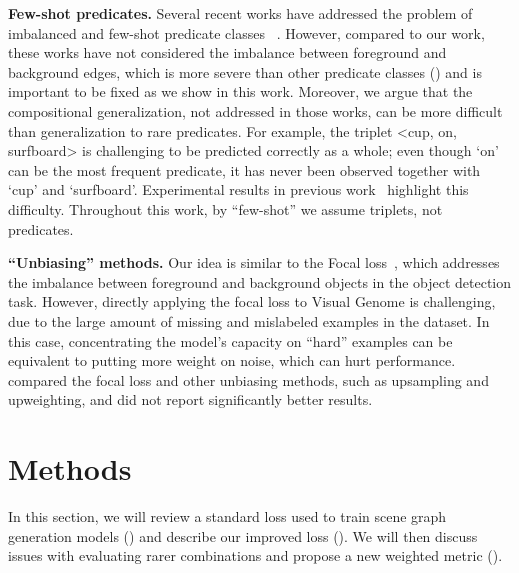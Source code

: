 \textbf{Few-shot predicates.} 
Several recent works have addressed the problem of imbalanced and few-shot predicate classes ~\citep{chen2019knowledge, dornadula2019visual,tang2019learning,zhang2019graphical,tang2020unbiased,chen2019scene}. However, compared to our work, these works have not considered the imbalance between foreground and background edges, which is more severe than other predicate classes (\fig{\ref{fig:pred_distr}}) and is important to be fixed as we show in this work.
Moreover, we argue that the compositional generalization, not addressed in those works, can be more difficult than generalization to rare predicates. For example, the triplet <cup, on, surfboard> is challenging to be predicted correctly as a whole; even though `on' can be the most frequent predicate, it has never been observed together with `cup' and `surfboard'. Experimental results in previous work~\citep{lu2016visual,zhang2017visual,yang2018shuffle,wang2019generating,tang2020unbiased} highlight this difficulty. Throughout this work, by ``few-shot'' we assume triplets, not predicates.

\textbf{``Unbiasing'' methods.}
Our idea is similar to the Focal loss~\citep{lin2017focal}, which addresses the imbalance between foreground and background objects in the object detection task. However, directly applying the focal loss to Visual Genome is challenging, due to the large amount of missing and mislabeled examples in the dataset. In this case, concentrating the model's capacity on ``hard'' examples can be equivalent to putting more weight on noise, which can hurt performance. \citet{tang2020unbiased} compared the focal loss and other unbiasing methods, such as upsampling and upweighting, and did not report significantly better results.


\section{Methods}
\label{sec:methods}
In this section, we will review a standard loss used to train scene graph generation models (\secref{\ref{sec:baseline}}) and describe our improved loss (\secref{\ref{sec:loss_norm}}). We will then discuss issues with evaluating rarer combinations and propose a new weighted metric (\secref{\ref{sec:metric}}). 



